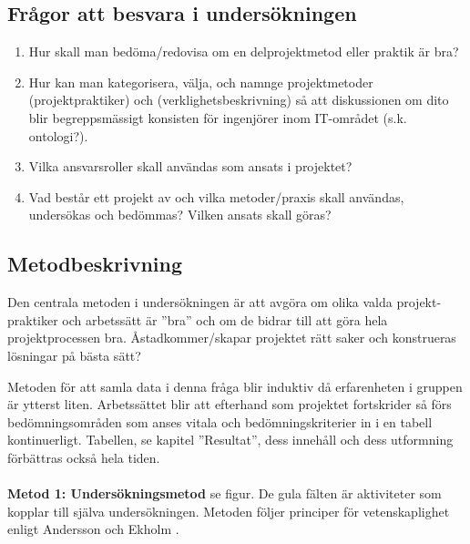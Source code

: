 \documentclass[conference,a4paper]{IEEEtran}
\begin{document}
\subsection{Frågor att besvara i undersökningen}

\begin{enumerate}

\item Hur skall man bedöma/redovisa om en delprojektmetod eller praktik är bra?

\item Hur kan man kategorisera, välja, och namnge projektmetoder (projektpraktiker) och (verklighetsbeskrivning) så att diskussionen om dito blir begreppsmässigt konsisten för ingenjörer inom IT-området (s.k. ontologi?).

\item Vilka ansvarsroller skall användas som ansats i projektet?

\item Vad består ett projekt av och vilka metoder/praxis skall användas, undersökas och bedömmas? Vilken ansats skall göras?

\end{enumerate}

\subsection{Metodbeskrivning}
Den centrala metoden i undersökningen är att avgöra om olika valda projekt-praktiker och arbetssätt är ”bra” och om de bidrar till att göra hela projektprocessen bra. Åstadkommer/skapar projektet rätt saker och konstrueras lösningar på bästa sätt?

Metoden för att samla data i denna fråga blir induktiv då erfarenheten i gruppen är ytterst liten. Arbetssättet blir att efterhand som projektet fortskrider så förs bedömningsområden som anses vitala och bedömningskriterier in i en tabell kontinuerligt. Tabellen, se kapitel ”Resultat”, dess innehåll och dess utformning förbättras också hela tiden.\\
\\
\textbf{Metod 1: Undersökningsmetod} se figur. De gula fälten är aktiviteter som kopplar till själva undersökningen. Metoden följer principer för vetenskaplighet enligt Andersson och Ekholm \cite{Andersson02}.
\end{document}
